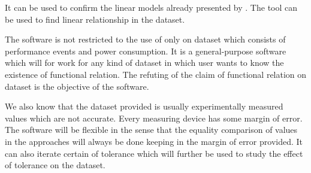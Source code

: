 It can be used to confirm the linear models already presented by \cite{bircher2007complete}\cite{bellosa2000benefits}\cite{o2017survey}. The tool can be used to find linear relationship in the dataset. 

The software is not restricted to the use of only on dataset which consists of performance events and power consumption. It is a general-purpose software which will for work for any kind of dataset in which user wants to know the existence of functional relation. The refuting of the claim of functional relation on dataset is the objective of the software.

We also know that the dataset provided is usually experimentally measured values which are not accurate. Every measuring device has some margin of error. The software will be flexible in the sense that the equality comparison of values in the approaches will always be done keeping in the margin of error provided. It can also iterate certain of tolerance which will further be used to study the effect of tolerance on the dataset.

